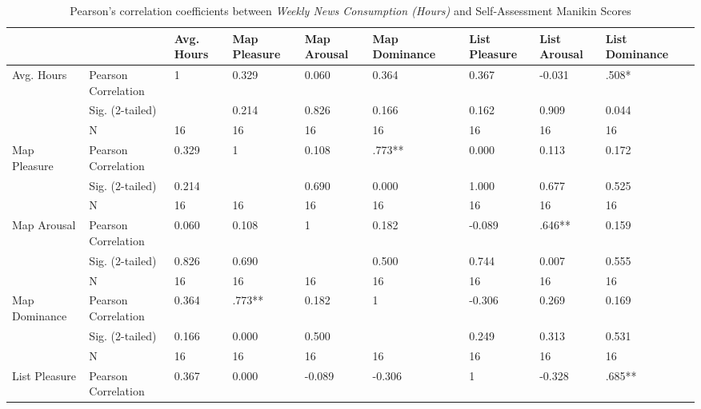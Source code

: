 \begin{landscape}
\begin{table}[hbtp!]
\centering
\caption{Pearson's correlation coefficients between \textit{Weekly News Consumption (Hours)} and Self-Assessment Manikin Scores}
\label{res:samcorrelation}\vspace{0.3cm}
\begin{tabular}{|l|l|l m{1.5cm} m{1.5cm} m{2cm} m{1.5cm} m{1.5cm} m{2cm}|}
\hline
                    &                     & Avg. Hours & Map Pleasure & Map Arousal & Map ~ ~  Dominance & List Pleasure & List Arousal & List ~ ~ Dominance \\ \hline
Avg. Hours 			& Pearson Correlation & 1      & 0.329  & 0.060  & 0.364  & 0.367  & -0.031 & .508*  \\
                    & Sig. (2-tailed)     &        & 0.214  & 0.826  & 0.166  & 0.162  & 0.909  & 0.044  \\
                    & N                   & 16                  & 16        & 16          & 16        & 16         & 16           & 16         \\
Map Pleasure           & Pearson Correlation & 0.329  & 1      & 0.108  & .773** & 0.000  & 0.113  & 0.172  \\
                    & Sig. (2-tailed)     & 0.214  &        & 0.690  & 0.000  & 1.000  & 0.677  & 0.525  \\
                    & N                   & 16                  & 16        & 16          & 16        & 16         & 16           & 16         \\
Map Arousal         & Pearson Correlation & 0.060  & 0.108  & 1      & 0.182  & -0.089 & .646** & 0.159  \\
                    & Sig. (2-tailed)     & 0.826  & 0.690  &        & 0.500  & 0.744  & 0.007  & 0.555  \\
                    & N                   & 16                  & 16        & 16          & 16        & 16         & 16           & 16         \\
Map Dominance           & Pearson Correlation & 0.364  & .773** & 0.182  & 1      & -0.306 & 0.269  & 0.169  \\
                    & Sig. (2-tailed)     & 0.166  & 0.000  & 0.500  &        & 0.249  & 0.313  & 0.531  \\
                    & N                   & 16                  & 16        & 16          & 16        & 16         & 16           & 16         \\
List Pleasure          & Pearson Correlation & 0.367  & 0.000  & -0.089 & -0.306 & 1      & -0.328 & .685** \\

\end{tabular}
\end{table}
\end{landscape}
